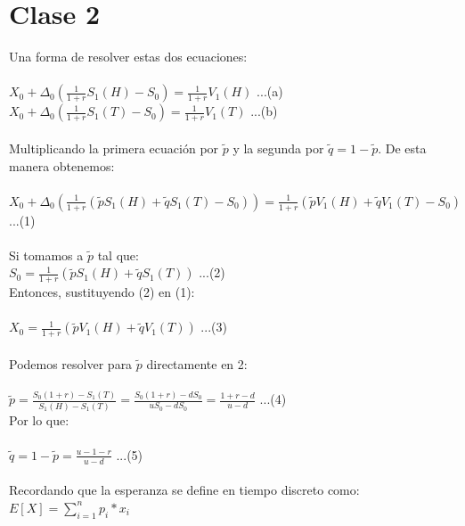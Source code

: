 \documentclass{article}
\begin{document}
        \section{Clase 2}
        Una forma de resolver estas dos ecuaciones:
        \\
        \\
        \(X_0 + \Delta_0 (\frac{1}{1+r}S_1(H)-S_0) = \frac{1}{1+r}V_1(H)\) ...(a)
        \\
        \(X_0 + \Delta_0 (\frac{1}{1+r}S_1(T)-S_0) = \frac{1}{1+r}V_1(T)\) ...(b)
        \\
        \\
        Multiplicando la primera ecuación por \(\tilde{p}\) y la segunda por \(\tilde{q}=1-\tilde{p}\). De esta manera obtenemos:
        \\
        \\
        \(X_{0} + \Delta_{0} (\frac{1}{1+r} (\tilde{p} S_{1}(H) + \tilde{q} S_{1}(T) - S_0)) = \frac{1}{1+r} (\tilde{p} V_{1}(H) + \tilde{q} V_{1}(T) - S_0) \) ...(1)
        \\
        \\
        Si tomamos a \(\tilde{p}\) tal que:
        \\
        \(S_{0} = \frac{1}{1+r} (\tilde{p} S_{1}(H) + \tilde{q}S_{1}(T)) \) ...(2)
        \\Entonces, sustituyendo (2) en (1):
        \\
        \\
        \(X_0 = \frac{1}{1+r} (\tilde{p}V_1(H) + \tilde{q}V_1(T)) \) ...(3)
        \\
        \\
        Podemos resolver para \(\tilde{p}\) directamente en 2:
        \\
        \\
        \(\tilde{p} = \frac{S_0(1+r) - S_1(T)}{S_1(H) - S_1(T)} = \frac{S_0(1+r) - dS_0}{uS_0 - dS_0}  = \frac{1+r-d}{u-d}\) ...(4)
        \\
        Por lo que:
        \\
        \\
        \(\tilde{q} = 1-\tilde{p} = \frac{u-1-r}{u-d}\) ...(5)
        \\
        \\
        Recordando que la esperanza se define en tiempo discreto como:
        \\
        \(E[X] = \sum_{i=1}^{n} p_i * x_i\)
        \\
        \\
\end{document}
